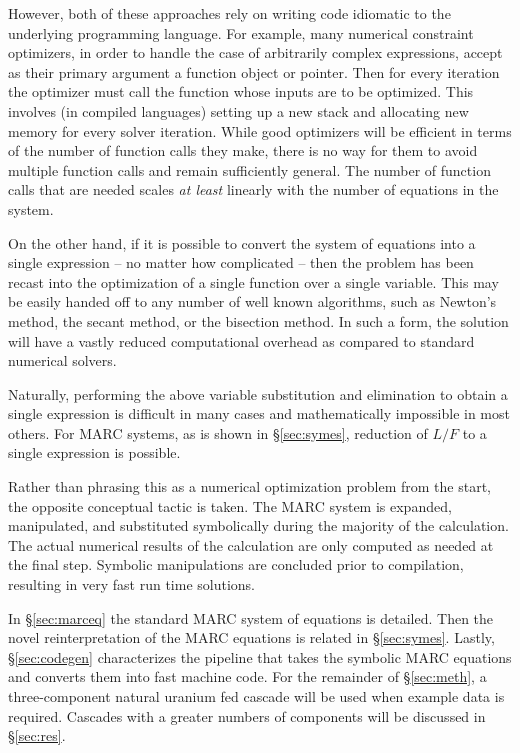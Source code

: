 \documentclass[preprint,12pt]{elsarticle}
\begin{document}
However, both of these approaches rely on writing code idiomatic to the underlying 
programming language.  For example, many numerical constraint optimizers, in order 
to handle the case of arbitrarily complex expressions, accept as their primary 
argument a function object or pointer.  Then for every iteration the optimizer must 
call the function whose inputs are to be optimized.  This involves (in compiled 
languages) setting up a new stack and allocating new memory for every solver 
iteration.  While good 
optimizers will be efficient in terms of the number of function calls they make, 
there is no way for them to avoid multiple function calls and remain sufficiently 
general. The number of function calls that are needed scales \emph{at least} linearly 
with the number of equations in the system.

On the other hand, if it is possible to convert the system of equations 
into a single expression -- no matter how complicated -- then the problem has been 
recast into the optimization of a single function over a single variable.   This 
may be easily handed off to any number of well known algorithms, such as Newton's
method, the secant method, or the bisection method.  In such a form, the solution 
will have a vastly reduced computational overhead as compared to standard 
numerical solvers. 

Naturally, performing the above variable substitution and elimination to obtain a 
single expression is difficult in many cases and mathematically impossible in most 
others.  For MARC systems, as is shown in \S \ref{sec:symes}, reduction of $L/F$
to a single expression is possible.

Rather than phrasing this as a numerical optimization problem from the start, the 
opposite conceptual tactic is taken.  The MARC system is expanded, manipulated, 
and substituted symbolically during the majority of the calculation.  The actual 
numerical results of the calculation are only computed as needed at the final step.
Symbolic manipulations are concluded prior to compilation, resulting in 
very fast run time solutions.

In \S \ref{sec:marceq} the standard MARC system of equations is detailed. 
Then the novel reinterpretation of the MARC equations is related in 
\S \ref{sec:symes}.  
Lastly, \S \ref{sec:codegen} characterizes the pipeline that takes the symbolic MARC 
equations and converts them into fast machine code.  
For the remainder of \S \ref{sec:meth}, a three-component natural uranium fed 
cascade will be used when example data is required.
Cascades with a greater numbers of components will be discussed in \S \ref{sec:res}.
\end{document}
